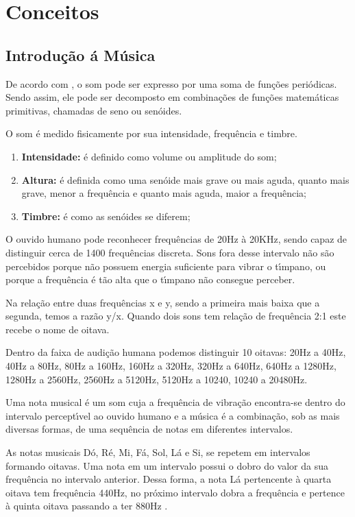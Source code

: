 \chapter{Conceitos}
\label{cap:conceitos}

\section{Introdução á Música}
\label{cap:conceitos:intr:musica}

De acordo com \cite{roads1996computer}, o som pode ser expresso por uma soma de funções periódicas. Sendo assim,
ele pode ser decomposto em combinações de funções matemáticas primitivas,
chamadas de seno ou senóides.

O som é medido fisicamente por sua intensidade, frequência e timbre.
\begin{enumerate}
	\item{\textbf{Intensidade:} é definido como volume ou amplitude do som;}
	\item{\textbf{Altura:} é definida como uma senóide mais grave ou  mais aguda, quanto mais grave, menor a frequência e quanto mais aguda, maior a frequência;}
	\item{\textbf{Timbre:} é como as senóides se diferem;}
\end{enumerate}

O ouvido humano pode reconhecer frequências de 20Hz à 20KHz, sendo
capaz de distinguir cerca de 1400 frequências discreta. Sons fora desse intervalo
não são percebidos porque não possuem energia suficiente para vibrar o tı́mpano,
ou porque a frequência é tão alta que o tı́mpano não consegue perceber.

Na relação entre duas frequências x e y, sendo a primeira mais baixa que a
segunda, temos a razão y/x. Quando dois sons tem relação de frequência 2:1
este recebe o nome de oitava.

Dentro da faixa de audição humana podemos distinguir 10 oitavas: 20Hz a
40Hz, 40Hz a 80Hz, 80Hz a 160Hz, 160Hz a 320Hz, 320Hz a 640Hz, 640Hz a
1280Hz, 1280Hz a 2560Hz, 2560Hz a 5120Hz, 5120Hz a 10240, 10240 a 20480Hz.

Uma nota musical é um som cuja a frequência de vibração encontra-se dentro
do intervalo perceptı́vel ao ouvido humano e a música é a combinação, sob as
mais diversas formas, de uma sequência de notas em diferentes intervalos.

As notas musicais Dó, Ré, Mi, Fá, Sol, Lá e Si, se repetem em intervalos
formando oitavas. Uma nota em um intervalo possui o dobro do valor da sua
frequência no intervalo anterior. Dessa forma, a nota Lá pertencente à quarta
oitava tem frequência 440Hz, no próximo intervalo dobra a frequência e pertence
à quinta oitava passando a ter 880Hz \cite{kostka2000tonal}.

